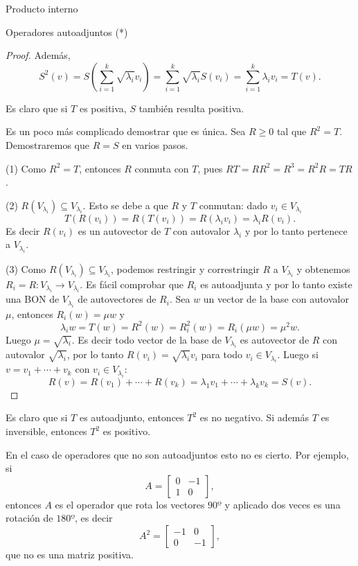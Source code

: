 \begin{chapter}{Producto interno}
\begin{section}{Operadores autoadjuntos (*)}
\begin{proof}
            
            Además, $$S^2(v) = S(\sum_{i=1}^k \sqrt{\lambda_i} v_i) = \sum_{i=1}^k \sqrt{\lambda_i}S( v_i) = \sum_{i=1}^k {\lambda_i}v_i = T(v).$$
            
            Es claro que si $T$ es positiva,  $S$ también resulta positiva.
            
            Es un poco más complicado demostrar que es única. Sea $R \ge 0$ tal que $R^2 = T$. Demostraremos que $R=S$ en varios pasos. 
            
            
            (1) Como $R^2 = T$, entonces $R$ conmuta con $T$, pues $RT = RR^2 = R^3 = R^2R = TR$. 
            
            (2) $R(V_{\lambda_i}) \subseteq V_{\lambda_i}$. Esto se debe a que $R$ y $T$ conmutan: dado $v_i \in V_{\lambda_i}$
            $$
            T(R(v_i)) = R(T(v_i)) = R(\lambda_i v_i) = \lambda_iR(v_i).  
            $$ 
            Es decir $R(v_i)$ es un autovector de $T$ con  autovalor $\lambda_i$ y por lo tanto pertenece a  $V_{\lambda_i}$. 
            
            (3)  Como $R(V_{\lambda_i}) \subseteq V_{\lambda_i}$, podemos restringir y correstringir  $R$ a $V_{\lambda_i}$ y obtenemos $R_i = R:  V_{\lambda_i} \to V_{\lambda_i}$. Es  fácil comprobar que $R_i$ es autoadjunta y por lo tanto existe una BON de $V_{\lambda_i}$ de autovectores de $R_i$. Sea $w$ un vector de la base con autovalor $\mu$, entonces 	$R_i(w) = \mu w$  y 
            $$
        \lambda_i w = T(w) = R^2(w) = R_i^2(w) = R_i(\mu w) = \mu^2 w. 
            $$
            Luego $\mu= \sqrt{\lambda_i}$. Es decir todo vector de la base de $V_{\lambda_i}$  es autovector de $R$ con  autovalor $\sqrt{\lambda_i}$, por lo tanto $R(v_i) =  \sqrt{\lambda_i}v_i$ para todo $v_i \in V_{\lambda_i}$. Luego si   $v = v_1+\cdots+v_k$ con $v_i \in V_{\lambda_i}$:
            $$
            R(v) = R(v_1)+\cdots+R(v_k) = \lambda_1 v_1+\cdots+\lambda_k v_k = S(v).
            $$
        \end{proof}
        
        \begin{obs*} Es claro que si $T$  es autoadjunto, entonces $T^2$ es no negativo. Si además $T$ es inversible, entonces $T^2$ es positivo. 
            
        En el caso de operadores que no son autoadjuntos esto no es cierto. Por  ejemplo, si 
        $$
        A = \begin{bmatrix}
        0&-1 \\ 1&0 
        \end{bmatrix},
        $$
        entonces $A$ es el operador que rota los vectores $90º$ y aplicado dos veces es una rotación de $180º$,  es decir  
        $$
        A^2 = \begin{bmatrix}
        -1&0 \\ 0&-1 
        \end{bmatrix},
        $$
        que no es una matriz positiva.
        \end{obs*}
        

\end{section}
\end{chapter}
